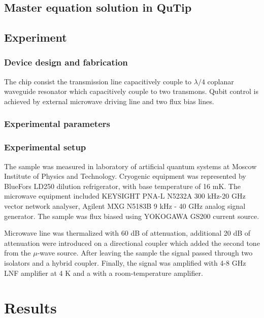 \documentclass[%
 aip,
 amsmath,amssymb,
 reprint,%
]{revtex4-1}
\begin{document}
\subsection{Master equation solution in QuTip}

\subsection{Experiment}
\subsubsection{Device design and fabrication}
The chip consist the transmission line capacitively couple to $\lambda/4$ coplanar waveguide resonator which capacitively couple to two transmons. Qubit control is achieved by external microwave driving line and two flux bias lines. 
\subsubsection{Experimental parameters}
\subsubsection{Experimental setup}
The sample was measured in laboratory of artificial quantum systems at Moscow Institute of Physics and Technology. Cryogenic equipment was
represented by BlueFors LD250 dilution refrigerator, with base temperature of 16 mK. The microwave equipment included KEYSIGHT PNA-L N5232A 300 kHz-20 GHz vector network analyser, Agilent MXG N5183B 9 kHz - 40 GHz analog signal generator. The sample was 
flux biased using YOKOGAWA GS200 current source.

Microwave line was thermalized with 60 dB of attenuation, additional 20 dB of attenuation were introduced on a directional coupler which added the second tone from the $\mu$-wave source. After leaving the sample the signal passed through two isolators and a hybrid coupler. Finally, the signal was amplified with 4-8 GHz LNF amplifier at 4 K and a with a room-temperature amplifier.

\section{Results}
\end{document}
